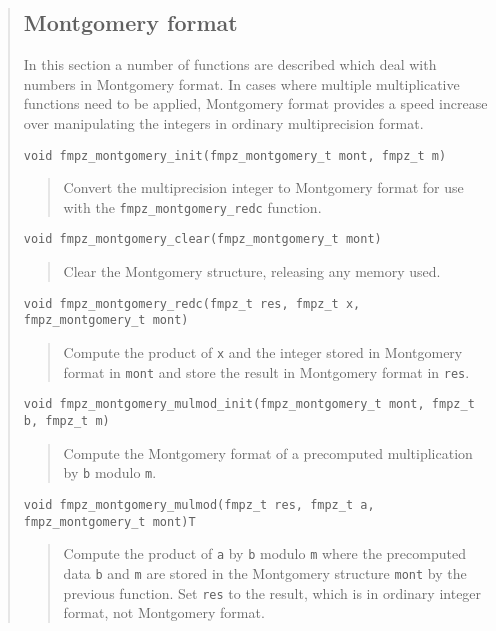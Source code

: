 \documentclass[a4paper,10pt]{article}
\newcommand{\code}{\lstinline}
\begin{document}
\begin{quote}
\subsection{Montgomery format}

In this section a number of functions are described which deal with numbers in Montgomery format. In cases where multiple multiplicative functions need to be applied, Montgomery format provides a speed increase over manipulating the integers in ordinary multiprecision format.

\begin{lstlisting}
void fmpz_montgomery_init(fmpz_montgomery_t mont, fmpz_t m) 
\end{lstlisting}
\begin{quote}
Convert the multiprecision integer to Montgomery format for use with the \code{fmpz_montgomery_redc} function.
\end{quote}

\begin{lstlisting}
void fmpz_montgomery_clear(fmpz_montgomery_t mont) 
\end{lstlisting}
\begin{quote}
Clear the Montgomery structure, releasing any memory used.
\end{quote}

\begin{lstlisting}
void fmpz_montgomery_redc(fmpz_t res, fmpz_t x, fmpz_montgomery_t mont) 
\end{lstlisting}
\begin{quote}
Compute the product of \code{x} and the integer stored in Montgomery format in \code{mont} and store the result in Montgomery format in \code{res}.
\end{quote}

\begin{lstlisting}
void fmpz_montgomery_mulmod_init(fmpz_montgomery_t mont, fmpz_t b, fmpz_t m) 
\end{lstlisting}
\begin{quote}
Compute the Montgomery format of a precomputed multiplication by \code{b} modulo \code{m}.
\end{quote}

\begin{lstlisting}
void fmpz_montgomery_mulmod(fmpz_t res, fmpz_t a, fmpz_montgomery_t mont)T
\end{lstlisting}
\begin{quote}
Compute the product of \code{a} by \code{b} modulo \code{m} where the precomputed data \code{b} and \code{m} are stored in the Montgomery structure \code{mont} by the previous function. Set \code{res} to the result, which is in ordinary integer format, not Montgomery format.
\end{quote}


\end{quote}
\end{document}
